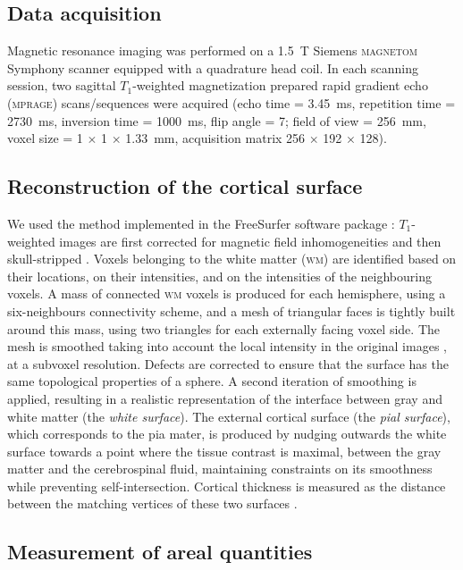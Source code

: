 \subsection{Data acquisition}

Magnetic resonance imaging was performed on a 1.5~T Siemens \textsc{magnetom} Symphony scanner equipped with a quadrature head coil. In each scanning session, two sagittal $T_1$-weighted magnetization prepared rapid gradient echo (\textsc{mprage}) scans/sequences were acquired (echo time = 3.45~ms, repetition time = 2730~ms, inversion time = 1000~ms, flip angle = 7\degree; field of view = 256~mm, voxel size = 1 $\times$ 1 $\times$ 1.33~mm, acquisition matrix 256 $\times$ 192 $\times$ 128).  

\subsection{Reconstruction of the cortical surface}

We used the method implemented in the FreeSurfer software package \cite[version 5.3.0;][]{Dale1999,Fischl1999_cortical}: $T_1$-weighted images are first corrected for magnetic field inhomogeneities and then skull-stripped \citep{Segonne2004}. Voxels belonging to the white matter (\textsc{wm}) are identified based on their locations, on their intensities, and on the intensities of the neighbouring voxels. A mass of connected \textsc{wm} voxels is produced for each hemisphere, using a six-neighbours connectivity scheme, and a mesh of triangular faces is tightly built around this mass, using two triangles for each externally facing voxel side. The mesh is smoothed taking into account the local intensity in the original images \citep{Dale1993}, at a subvoxel resolution. Defects are corrected \citep{Fischl2001,Segonne2007} to ensure that the surface has the same topological properties of a sphere. A second iteration of smoothing is applied, resulting in a realistic representation of the interface between gray and white matter (the \emph{white surface}). The external cortical surface (the \emph{pial surface}), which corresponds to the pia mater, is produced by nudging outwards the white surface towards a point where the tissue contrast is maximal, between the gray matter and the cerebrospinal fluid, maintaining constraints on its smoothness while preventing self-intersection. Cortical thickness is measured as the distance between the matching vertices of these two surfaces \citep{Fischl2000}.

\subsection{Measurement of areal quantities}

